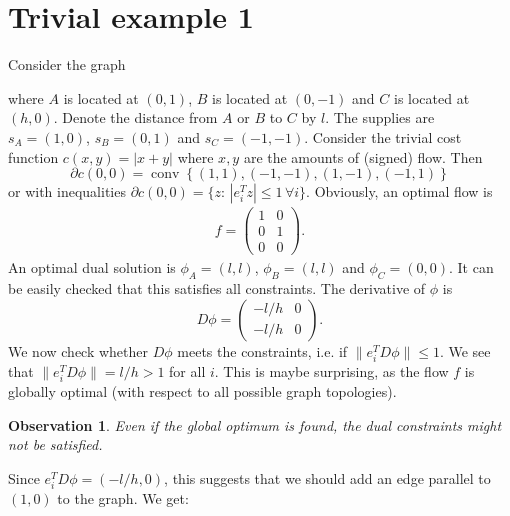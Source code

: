 \documentclass[10pt,a4paper]{article}
\DeclareMathOperator{\conv}{conv}
\newtheorem{observation}{Observation}
\begin{document}
	\section{Trivial example 1}
	Consider the graph
\begin{center}
\end{center}
where $A$ is located at $(0,1)$, $B$ is located at $(0,-1)$ and $C$ is located at $(h,0)$. Denote the distance from $A$ or $B$ to $C$ by $l$. The supplies are $s_A = (1,0)$, $s_B = (0,1)$ and $s_C = (-1,-1)$. Consider the trivial cost function $c(x,y) = |x+y|$ where $x, y$ are the amounts of (signed) flow. Then
\[
\partial c(0,0) = \conv\left\{ (1,1),(-1,-1),(1,-1),(-1,1) \right\}
\]
or with inequalities $\partial c(0,0) = \{z:\, |e_i^T z| \leq 1 \,\forall i \}$. Obviously, an optimal flow is
\begin{align*}
f = \begin{pmatrix}
1&0\\0&1\\0&0
\end{pmatrix}.
\end{align*}
An optimal dual solution is $\phi_A = (l,l)$, $\phi_B = (l,l)$ and $\phi_C = (0,0)$. It can be easily checked that this satisfies all constraints. The derivative of $\phi$ is
\[
D\phi = \begin{pmatrix}
-l/h & 0\\-l/h & 0
\end{pmatrix}.
\]
We now check whether $D\phi$ meets the constraints, i.e. if $\lVert e_i^T D\phi \rVert\leq 1$. We see that $\lVert e_i^TD\phi \rVert = l/h > 1$ for all $i$. This is maybe surprising, as the flow $f$ is globally optimal (with respect to all possible graph topologies).
\begin{observation}
	Even if the global optimum is found, the dual constraints might not be satisfied.
\end{observation}
Since $e_i^T D\phi = (-l/h,0)$, this suggests that we should add an edge parallel to $(1,0)$ to the graph. We get:
\begin{center}
\end{center}
\end{document}
